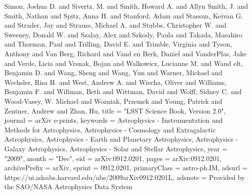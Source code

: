 \documentclass{aa}
\begin{document}
{{{{{{{{{{{{{{{{         {Simon}, Joshua D. and {Sivertz}, M. and {Smith}, Howard A. and
         {Allyn Smith}, J. and {Smith}, Nathan and {Spitz}, Anna H. and
         {Stanford}, Adam and {Stassun}, Keivan G. and {Strader}, Jay and
         {Strauss}, Michael A. and {Stubbs}, Christopher W. and
         {Sweeney}, Donald W. and {Szalay}, Alex and {Szkody}, Paula and
         {Takada}, Masahiro and {Thorman}, Paul and {Trilling}, David E. and
         {Trimble}, Virginia and {Tyson}, Anthony and {Van Berg}, Richard and {Vand
        en Berk}, Daniel and {VanderPlas}, Jake and {Verde}, Licia and
         {Vrsnak}, Bojan and {Walkowicz}, Lucianne M. and {Wand
        elt}, Benjamin D. and {Wang}, Sheng and {Wang}, Yun and
         {Warner}, Michael and {Wechsler}, Risa H. and {West}, Andrew A. and
         {Wiecha}, Oliver and {Williams}, Benjamin F. and {Willman}, Beth and
         {Wittman}, David and {Wolff}, Sidney C. and {Wood-Vasey}, W. Michael and
         {Wozniak}, Przemek and {Young}, Patrick and {Zentner}, Andrew and
         {Zhan}, Hu},
        title = "{LSST Science Book, Version 2.0}",
      journal = {arXiv e-prints},
     keywords = {Astrophysics - Instrumentation and Methods for Astrophysics, Astrophysics - Cosmology and Extragalactic Astrophysics, Astrophysics - Earth and Planetary Astrophysics, Astrophysics - Galaxy Astrophysics, Astrophysics - Solar and Stellar Astrophysics},
         year = "2009",
        month = "Dec",
          eid = {arXiv:0912.0201},
        pages = {arXiv:0912.0201},
archivePrefix = {arXiv},
       eprint = {0912.0201},
 primaryClass = {astro-ph.IM},
       adsurl = {https://ui.adsabs.harvard.edu/abs/2009arXiv0912.0201L},
      adsnote = {Provided by the SAO/NASA Astrophysics Data System}
}

}}}}}}}}}}}}}}
\end{document}
